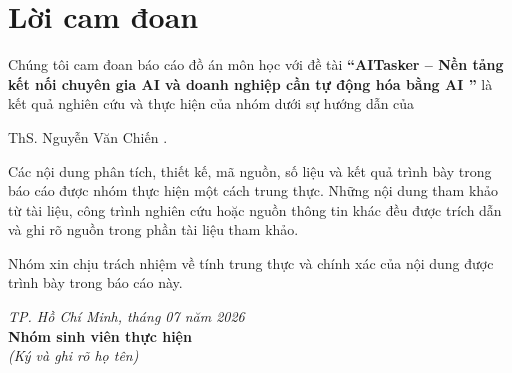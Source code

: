 \documentclass[14pt,a4paper,oneside]{extreport}
\newcommand{\projectname}{AITasker}
\newcommand{\projectfullname}{
    Nền tảng kết nối chuyên gia AI và doanh nghiệp cần tự động hóa bằng AI
}
\newcommand{\instructorname}{
    ThS. Nguyễn Văn Chiến
}
\begin{document}
\sloppy





\clearpage


\setcounter{page}{1}


\chapter*{Lời cam đoan}

Chúng tôi cam đoan báo cáo đồ án môn học với đề tài
\textbf{``\projectname{} -- \projectfullname''}
là kết quả nghiên cứu và thực hiện của nhóm dưới sự hướng dẫn của
\instructorname.

Các nội dung phân tích, thiết kế, mã nguồn, số liệu và kết quả trình bày
trong báo cáo được nhóm thực hiện một cách trung thực. Những nội dung tham
khảo từ tài liệu, công trình nghiên cứu hoặc nguồn thông tin khác đều được
trích dẫn và ghi rõ nguồn trong phần tài liệu tham khảo.

Nhóm xin chịu trách nhiệm về tính trung thực và chính xác của nội dung
được trình bày trong báo cáo này.

\vspace{2.5cm}

\begin{flushright}
    \textit{TP. Hồ Chí Minh, tháng 07 năm 2026}\\[1cm]

    \textbf{Nhóm sinh viên thực hiện}\\[0.5cm]

    \textit{(Ký và ghi rõ họ tên)}
\end{flushright}

\clearpage

\end{document}
